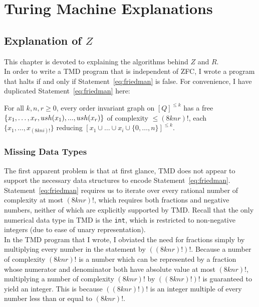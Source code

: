 \chapter{Turing Machine Explanations}

\section{Explanation of $Z$}

This chapter is devoted to explaining the algorithms behind $Z$ and $R$. \\

In order to write a TMD program that is independent of ZFC, I wrote a program that halts if and only if Statement~\ref{eq:friedman} is false. For convenience, I have duplicated Statement~\ref{eq:friedman} here: \\

\begin{statement} \label{eq:friedman2}
For all $k, n, r \ge 0$, every order invariant graph on $[Q]^{\le k}$ has a free $\{x_1,\dots,x_r, \\
ush(x_1),...,ush(x_r)\}$ of complexity $\le (8knr)!$, each $\{x_1, \dots, x_{(8kni)!}\}$
reducing $[x_1 \cup \dots \cup x_i \cup \{0,\dots,n\}]^{\le k}$. \cite{friedman}
\end{statement}

\subsection{Missing Data Types}

The first apparent problem is that at first glance, TMD does not appear to support the necessary data structures to encode Statement~\ref{eq:friedman}. Statement~\ref{eq:friedman} requires us to iterate over every rational number of complexity at most $(8knr)!$, which requires both fractions and negative numbers, neither of which are explicitly supported by TMD. Recall that the only numerical data type in TMD is the \texttt{int}, which is restricted to non-negative integers (due to ease of unary representation).\\

In the TMD program that I wrote, I obviated the need for fractions simply by multiplying every number in the statement by $((8knr)!)!$. Because a number of complexity $(8knr)!$ is a number which can be represented by a fraction whose numerator and denominator both have absolute value at most $(8knr)!$, multiplying a number of complexity $(8knr)!$ by $((8knr)!)!$ is guaranteed to yield an integer. This is because $((8knr)!)!$ is an integer multiple of every number less than or equal to $(8knr)!$. \\

